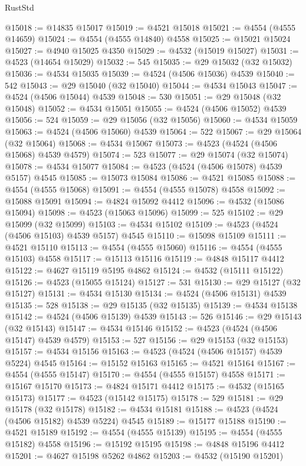 \begin{lexlean}{RustStd}
\begin{coremodule}
@15018 := @14835 @15017
@15019 := @4521 @15018
@15021 := @4554 (@4555 @14659)
@15024 := @4554 (@4555 @14840) @4558
@15025 := @15021 @15024
@15027 := @4940 @15025 @4350
@15029 := @4532 (@15019 @15027)
@15031 := @4523 (@14654 @15029)
@15032 := 545
@15035 := @29 @15032 (@32 @15032)
@15036 := @4534 @15035
@15039 := @4524 (@4506 @15036) @4539
@15040 := 542
@15043 := @29 @15040 (@32 @15040)
@15044 := @4534 @15043
@15047 := @4524 (@4506 @15044) @4539
@15048 := 530
@15051 := @29 @15048 (@32 @15048)
@15052 := @4534 @15051
@15055 := @4524 (@4506 @15052) @4539
@15056 := 524
@15059 := @29 @15056 (@32 @15056)
@15060 := @4534 @15059
@15063 := @4524 (@4506 @15060) @4539
@15064 := 522
@15067 := @29 @15064 (@32 @15064)
@15068 := @4534 @15067
@15073 := @4523 (@4524 (@4506 @15068) @4539 @4579)
@15074 := 523
@15077 := @29 @15074 (@32 @15074)
@15078 := @4534 @15077
@15084 := @4523 (@4524 (@4506 @15078) @4539 @5157) @4545
@15085 := @15073 @15084
@15086 := @4521 @15085
@15088 := @4554 (@4555 @15068)
@15091 := @4554 (@4555 @15078) @4558
@15092 := @15088 @15091
@15094 := @4824 @15092 @4412
@15096 := @4532 (@15086 @15094)
@15098 := @4523 (@15063 @15096)
@15099 := 525
@15102 := @29 @15099 (@32 @15099)
@15103 := @4534 @15102
@15109 := @4523 (@4524 (@4506 @15103) @4539 @5157) @4545
@15110 := @15098 @15109
@15111 := @4521 @15110
@15113 := @4554 (@4555 @15060)
@15116 := @4554 (@4555 @15103) @4558
@15117 := @15113 @15116
@15119 := @4848 @15117 @4412
@15122 := @4627 @15119 @5195 @4862
@15124 := @4532 (@15111 @15122)
@15126 := @4523 (@15055 @15124)
@15127 := 531
@15130 := @29 @15127 (@32 @15127)
@15131 := @4534 @15130
@15134 := @4524 (@4506 @15131) @4539
@15135 := 528
@15138 := @29 @15135 (@32 @15135)
@15139 := @4534 @15138
@15142 := @4524 (@4506 @15139) @4539
@15143 := 526
@15146 := @29 @15143 (@32 @15143)
@15147 := @4534 @15146
@15152 := @4523 (@4524 (@4506 @15147) @4539 @4579)
@15153 := 527
@15156 := @29 @15153 (@32 @15153)
@15157 := @4534 @15156
@15163 := @4523 (@4524 (@4506 @15157) @4539 @5224) @4545
@15164 := @15152 @15163
@15165 := @4521 @15164
@15167 := @4554 (@4555 @15147)
@15170 := @4554 (@4555 @15157) @4558
@15171 := @15167 @15170
@15173 := @4824 @15171 @4412
@15175 := @4532 (@15165 @15173)
@15177 := @4523 (@15142 @15175)
@15178 := 529
@15181 := @29 @15178 (@32 @15178)
@15182 := @4534 @15181
@15188 := @4523 (@4524 (@4506 @15182) @4539 @5224) @4545
@15189 := @15177 @15188
@15190 := @4521 @15189
@15192 := @4554 (@4555 @15139)
@15195 := @4554 (@4555 @15182) @4558
@15196 := @15192 @15195
@15198 := @4848 @15196 @4412
@15201 := @4627 @15198 @5262 @4862
@15203 := @4532 (@15190 @15201)

\end{coremodule}
\end{lexlean}

